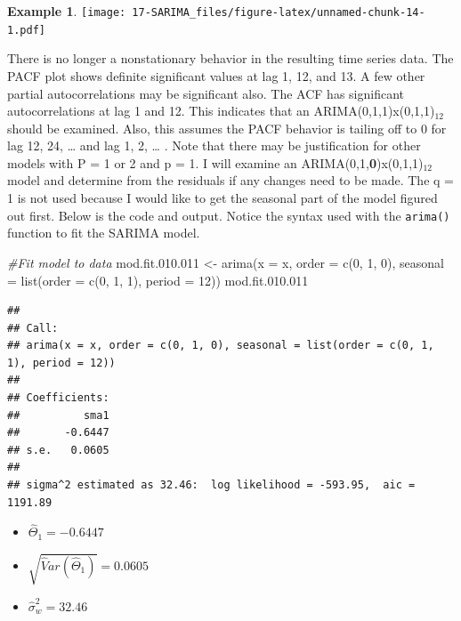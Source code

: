 \documentclass[
]{book}
\newenvironment{Shaded}{\begin{snugshade}}{\end{snugshade}}
\newcommand{\AttributeTok}[1]{\textcolor[rgb]{0.77,0.63,0.00}{#1}}
\newcommand{\CommentTok}[1]{\textcolor[rgb]{0.56,0.35,0.01}{\textit{#1}}}
\newcommand{\DecValTok}[1]{\textcolor[rgb]{0.00,0.00,0.81}{#1}}
\newcommand{\FloatTok}[1]{\textcolor[rgb]{0.00,0.00,0.81}{#1}}
\newcommand{\FunctionTok}[1]{\textcolor[rgb]{0.00,0.00,0.00}{#1}}
\newcommand{\NormalTok}[1]{#1}
\newcommand{\OtherTok}[1]{\textcolor[rgb]{0.56,0.35,0.01}{#1}}
\theoremstyle{definition}
\theoremstyle{definition}
\newtheorem{example}{Example}[chapter]
\theoremstyle{definition}
\theoremstyle{definition}
\theoremstyle{remark}
\begin{document}
\begin{example}
\texttt{[image: 17-SARIMA\_files/figure-latex/unnamed-chunk-14-1.pdf]}

There is no longer a nonstationary behavior in the resulting time series data. The PACF plot shows definite significant values at lag 1, 12, and 13. A few other partial autocorrelations may be significant also. The ACF has significant autocorrelations at lag 1 and 12. This indicates that an ARIMA(0,1,1)x(0,1,1)\(_{12}\) should be examined. Also, this assumes the PACF behavior is tailing off to 0 for lag 12, 24, \ldots{} and lag 1, 2, \ldots{} . Note that there may be justification for other models with P = 1 or 2 and p = 1. I will examine an ARIMA(0,1,\textbf{0})x(0,1,1)\(_{12}\) model and determine from the residuals if any changes need to be made. The q = 1 is not used because I would like to get the seasonal part of the model figured out first. Below is the code and output. Notice the syntax used with the \texttt{arima()} function to fit the SARIMA model.

\begin{Shaded}
\begin{Highlighting}[]
\CommentTok{\#Fit model to data}
\NormalTok{mod.fit.}\FloatTok{010.011} \OtherTok{\textless{}{-}} \FunctionTok{arima}\NormalTok{(}\AttributeTok{x =}\NormalTok{ x, }\AttributeTok{order =} \FunctionTok{c}\NormalTok{(}\DecValTok{0}\NormalTok{, }\DecValTok{1}\NormalTok{, }\DecValTok{0}\NormalTok{), }
    \AttributeTok{seasonal =} \FunctionTok{list}\NormalTok{(}\AttributeTok{order =} \FunctionTok{c}\NormalTok{(}\DecValTok{0}\NormalTok{, }\DecValTok{1}\NormalTok{, }\DecValTok{1}\NormalTok{), }\AttributeTok{period =} \DecValTok{12}\NormalTok{))}
\NormalTok{mod.fit.}\FloatTok{010.011}
\end{Highlighting}
\end{Shaded}

\begin{verbatim}
## 
## Call:
## arima(x = x, order = c(0, 1, 0), seasonal = list(order = c(0, 1, 1), period = 12))
## 
## Coefficients:
##          sma1
##       -0.6447
## s.e.   0.0605
## 
## sigma^2 estimated as 32.46:  log likelihood = -593.95,  aic = 1191.89
\end{verbatim}

\begin{itemize}
\item
  \(\hat \Theta_1=-0.6447\)
\item
  \(\sqrt{\hat Var(\hat \Theta_1)}=0.0605\)
\item
  \(\hat \sigma_w^2=32.46\)
\end{itemize}


\end{example}
\end{document}
